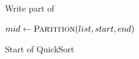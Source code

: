 \documentclass{article}
\begin{document}
\begin{homeworkProblem}
	Write part of 
	
	\begin{algorithm}[]
		\begin{algorithmic}[1]
			\State{} \Return{}
			\EndIf{}
			\State{} $mid \gets \Call{Partition}{list, start, end}$
			\State{} 
			\State{} 
			\EndFunction{}
		\end{algorithmic}
		\caption{Start of QuickSort}
	\end{algorithm}
\end{homeworkProblem}

\pagebreak
\end{document}
